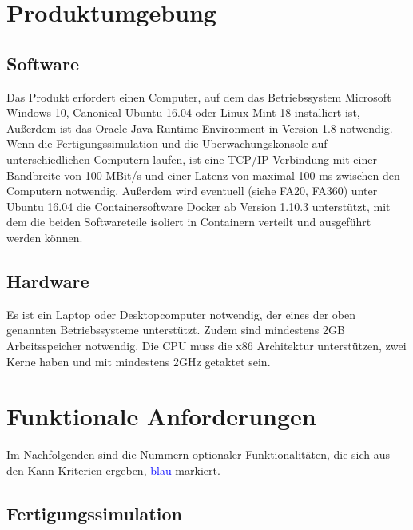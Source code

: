 \documentclass[parskip=full]{scrartcl}
\begin{document}
\pagebreak
\section{Produktumgebung}
\subsection{Software}
Das Produkt erfordert einen Computer, auf dem das Betriebssystem Microsoft Windows 10, Canonical Ubuntu 16.04 oder Linux Mint 18 installiert ist,
Außerdem ist das Oracle Java Runtime Environment in Version 1.8
notwendig. Wenn die \gls{Fertigungssimulation} und die \gls{Uberwachungskonsole} auf unterschiedlichen Computern laufen,
ist eine \gls{TCP/IP} Verbindung mit einer Bandbreite von 100 MBit/s und einer Latenz von maximal 100 ms zwischen den Computern notwendig.
Außerdem wird eventuell (siehe FA20, FA360) unter Ubuntu 16.04 die Containersoftware Docker
ab Version 1.10.3 unterstützt, mit dem die beiden Softwareteile isoliert in Containern verteilt und ausgeführt werden können.

\subsection{Hardware}
\label{Hardware}
Es ist ein Laptop oder Desktopcomputer notwendig, der eines der oben genannten Betriebssysteme unterstützt.
Zudem sind mindestens 2GB Arbeitsspeicher notwendig. Die CPU muss die x86 Architektur unterstützen, zwei Kerne haben und mit
mindestens 2GHz getaktet sein.

\pagebreak
\section{Funktionale Anforderungen}
Im Nachfolgenden sind die Nummern optionaler Funktionalitäten, die sich aus den Kann-Kriterien ergeben, \textcolor{blue}{blau} markiert.

\subsection{Fertigungssimulation}
\end{document}

